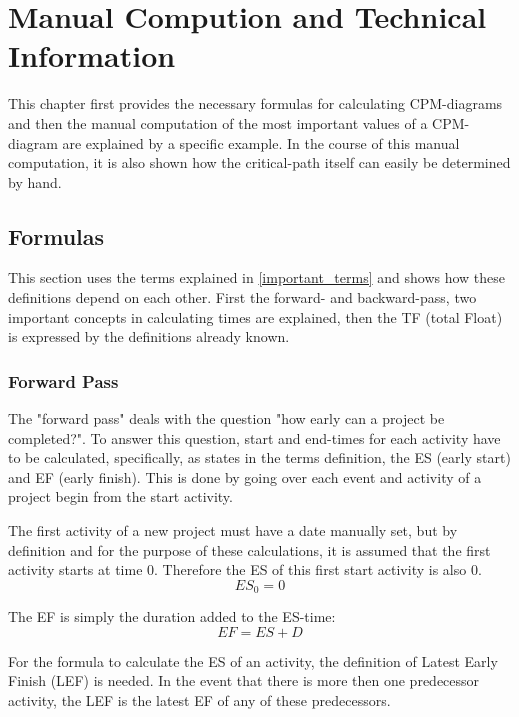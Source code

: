 \section{Manual Compution and Technical Information}

This chapter first provides the necessary formulas for calculating CPM-diagrams and then the manual computation of the most important values of a CPM-diagram are explained by a specific example. In the course of this manual computation, it is also shown how the critical-path itself can easily be determined by hand.

\subsection{Formulas} \label{formulas}

This section uses the terms explained in \ref{important_terms} and shows how these definitions depend on each other.
First the forward- and backward-pass, two important concepts in calculating times are explained, then the TF (total Float) is expressed by the definitions already known.
\subsubsection{Forward Pass} \label{forwardPass}
The "forward pass" deals with the question "how early can a project be completed?". To answer this question, start and end-times for each activity have to be calculated, specifically, as states in the terms definition, the ES (early start) and EF (early finish).
This is done by going over each event and activity of a project begin from the start activity.

The first activity of a new project must have a date manually set, but by definition and for the purpose of these calculations, it is assumed that the first activity starts at time 0.\cite{obrien} Therefore the ES of this first start activity is also 0.
\begin{equation}
ES_{0} = 0
\end{equation}

The EF is simply the duration added to the ES-time:
\begin{equation}
EF = ES + D
\end{equation}

For the formula to calculate the ES of an activity, the definition of Latest Early Finish (LEF) is needed. In the event that there is more then one predecessor activity, the LEF is the latest EF of any of these predecessors.

